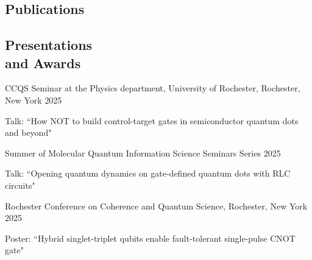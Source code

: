 \documentclass[margin,line]{res}
\newenvironment{list1}{
  \begin{list}{\ding{113}}{%
      \setlength{\itemsep}{0in}
      \setlength{\parsep}{0in} \setlength{\parskip}{0in}
      \setlength{\topsep}{0in} \setlength{\partopsep}{0in} 
      \setlength{\leftmargin}{0.17in}}}{\end{list}}
\begin{document}
\pagestyle{headings}


\begin{resume}

\section{\sc Publications}


\end{resume}

\newpage

\pagestyle{headings}


\begin{resume}

\section{\sc Presentations \\and Awards}

CCQS Seminar at the Physics department, University of Rochester, Rochester, New York \hfill{2025}

\begin{list1}
\item[]Talk: ``How NOT to build control-target gates in semiconductor quantum dots and beyond"
\end{list1}

\vspace*{-2mm}

Summer of Molecular Quantum Information Science Seminars Series \hfill{2025}

\begin{list1}
\item[]Talk: ``Opening quantum dynamics on gate-defined quantum dots with RLC circuits"
\end{list1}

\vspace*{-2mm}

Rochester Conference on Coherence and Quantum Science, Rochester, New York \hfill{2025}

\begin{list1}
\item[]Poster: ``Hybrid singlet-triplet qubits enable fault-tolerant single-pulse CNOT gate"
\end{list1}

\vspace*{-2mm}


\end{resume}
\end{document}
